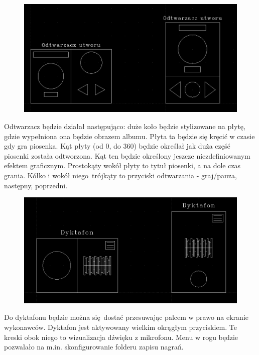 \begin{figure}[H]
	\centering
	\includegraphics[width=1\textwidth]{images/mockup_odtwarzacz.png}
	\caption{}
\end{figure}

Odtwarzacz będzie działał następująco: duże koło będzie stylizowane na płytę, gdzie wypełniona ona będzie obrazem albumu. Płyta ta będzie się kręcić w czasie gdy gra piosenka. Kąt płyty (od 0\degree, do 360\degree) będzie określał jak duża część piosenki została odtworzona. Kąt ten będzie określony jeszcze niezdefiniowanym efektem graficznym. Prostokąty wokół płyty to tytuł piosenki, a na dole czas grania. Kółko i wokół niego trójkąty to przyciski odtwarzania - graj/pauza, następny, poprzedni. 

\begin{figure}[H]
	\centering
	\includegraphics[width=1\textwidth]{images/mockup_dyktafon.png}
	\caption{}
\end{figure}

Do dyktafonu będzie można się dostać przesuwając palcem w prawo na ekranie wykonawców. Dyktafon jest aktywowany wielkim okrągłym przyciskiem. Te kreski obok niego to wizualizacja dźwięku z mikrofonu. Menu w rogu będzie pozwalało na m.in. skonfigurowanie folderu zapisu nagrań.
